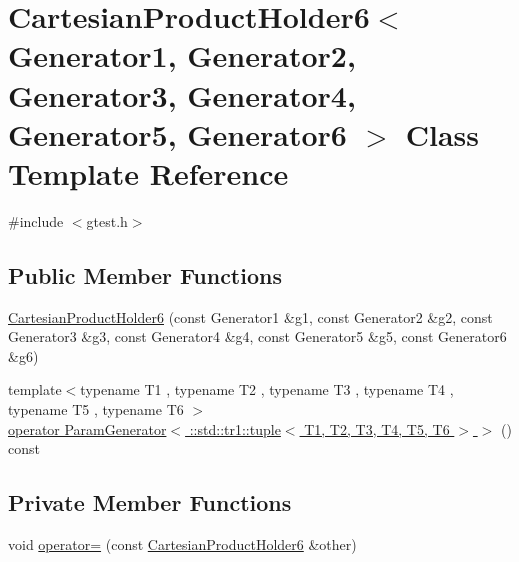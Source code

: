 \hypertarget{classtesting_1_1internal_1_1CartesianProductHolder6}{\section{\-Cartesian\-Product\-Holder6$<$ \-Generator1, \-Generator2, \-Generator3, \-Generator4, \-Generator5, \-Generator6 $>$ \-Class \-Template \-Reference}
\label{da/dd4/classtesting_1_1internal_1_1CartesianProductHolder6}
}


{\ttfamily \#include $<$gtest.\-h$>$}

\subsection*{\-Public \-Member \-Functions}
\begin{DoxyCompactItemize}
\item 
\hyperlink{classtesting_1_1internal_1_1CartesianProductHolder6_a652129b1e94abd5516bb3f7b45f30418}{\-Cartesian\-Product\-Holder6} (const \-Generator1 \&g1, const \-Generator2 \&g2, const \-Generator3 \&g3, const \-Generator4 \&g4, const \-Generator5 \&g5, const \-Generator6 \&g6)
\item 
{\footnotesize template$<$typename T1 , typename T2 , typename T3 , typename T4 , typename T5 , typename T6 $>$ }\\\hyperlink{classtesting_1_1internal_1_1CartesianProductHolder6_a7d2245a82942dc7d25e6db0304a1571f}{operator Param\-Generator$<$ \-::std\-::tr1\-::tuple$<$ T1, T2, T3, T4, T5, T6 $>$ $>$} () const 
\end{DoxyCompactItemize}
\subsection*{\-Private \-Member \-Functions}
\begin{DoxyCompactItemize}
\item 
void \hyperlink{classtesting_1_1internal_1_1CartesianProductHolder6_ad929660a4bf634277efcf57c670db9a1}{operator=} (const \hyperlink{classtesting_1_1internal_1_1CartesianProductHolder6}{\-Cartesian\-Product\-Holder6} \&other)
\end{DoxyCompactItemize}
